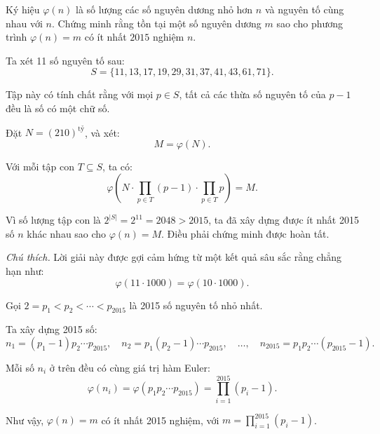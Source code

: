 \ifshowproblemandsoln
\ifshowproblem\begin{problem}\label{problem:USA-2015-TSTST-P5}\fi
\ifshowsoln\begin{problem}\fi
    Ký hiệu \( \varphi(n) \) là số lượng các số nguyên dương nhỏ hơn \( n \) và nguyên tố cùng nhau với \( n \).  
    Chứng minh rằng tồn tại một số nguyên dương \( m \) sao cho phương trình \( \varphi(n) = m \) có ít nhất \( 2015 \) nghiệm \( n \).
\end{problem}
\fi

\ifshowsoln
\begin{soln}\footnotemark
    Ta xét 11 số nguyên tố sau:
    \[
        S = \{11, 13, 17, 19, 29, 31, 37, 41, 43, 61, 71\}.
    \]

    Tập này có tính chất rằng với mọi \( p \in S \), tất cả các thừa số nguyên tố của \( p - 1 \) đều là số có một chữ số.

    Đặt \( N = (210)^{\text{tỷ}} \), và xét:
    \[
        M = \varphi(N).
    \]

    Với mỗi tập con \( T \subseteq S \), ta có:
    \[
        \varphi\left( N \cdot \prod_{p \in T} (p - 1) \cdot \prod_{p \in T} p \right) = M.
    \]

    Vì số lượng tập con là \( 2^{|S|} = 2^{11} = 2048 > 2015 \), ta đã xây dựng được ít nhất 2015 số \( n \) khác nhau sao cho \( \varphi(n) = M \). Điều phải chứng minh được hoàn tất.

    \textit{Chú thích.} Lời giải này được gợi cảm hứng từ một kết quả sâu sắc rằng chẳng hạn như:
    \[
        \varphi(11 \cdot 1000) = \varphi(10 \cdot 1000).
    \]
\end{soln}

\begin{soln}\footnotemark
    Gọi \( 2 = p_1 < p_2 < \cdots < p_{2015} \) là 2015 số nguyên tố nhỏ nhất.

    Ta xây dựng 2015 số:
    \[
        n_1 = (p_1 - 1)p_2 \cdots p_{2015},\quad
        n_2 = p_1(p_2 - 1) \cdots p_{2015},\quad
        \ldots,\quad
        n_{2015} = p_1p_2 \cdots (p_{2015} - 1).
    \]

    Mỗi số \( n_i \) ở trên đều có cùng giá trị hàm Euler:
    \[
        \varphi(n_i) = \varphi(p_1p_2 \cdots p_{2015}) = \prod_{i = 1}^{2015} (p_i - 1).
    \]

    Như vậy, \( \varphi(n) = m \) có ít nhất 2015 nghiệm, với \( m = \prod_{i = 1}^{2015} (p_i - 1) \).
\end{soln}
\fi


\end{problem}
